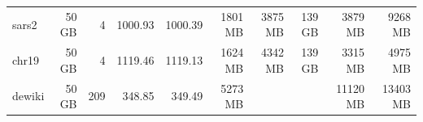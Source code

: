 \begin{tabular}{l|r|r|r|r|r|r|r|r|r}
 sars2 & \num{50} GB &   \num{4} & \num{1000.93} & \num{1000.39} & \num{1801} MB & \num{3875} MB & \num{139} GB &  \num{3879} MB &  \num{9268} MB \\
 chr19 & \num{50} GB &   \num{4} & \num{1119.46} & \num{1119.13} & \num{1624} MB & \num{4342} MB & \num{139} GB &  \num{3315} MB &  \num{4975} MB \\
dewiki & \num{50} GB & \num{209} &  \num{348.85} &  \num{349.49} & \num{5273} MB &               &              & \num{11120} MB & \num{13403} MB \\
\hline
\end{tabular}
